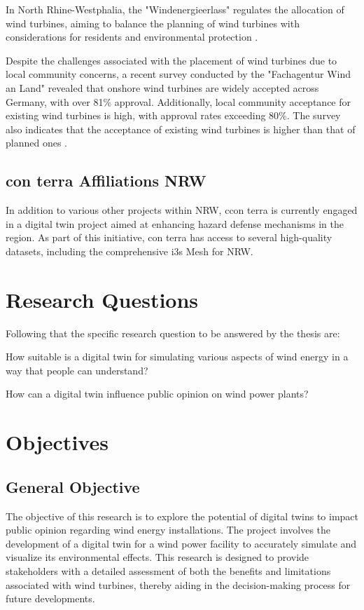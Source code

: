 \documentclass[11pt, titlepage, a4paper]{scrartcl}
\begin{document}
\begin{linenumbers}
    In North Rhine-Westphalia, the "Windenergieerlass" \cite{nrwErlassFurPlanung} regulates the allocation of wind turbines, aiming to balance the planning of wind turbines with considerations for residents and environmental protection \cite{fachagenturwindenergieanlandFachagenturWindenergieLand}.

    Despite the challenges associated with the placement of wind turbines due to local community concerns, a recent survey conducted by the "Fachagentur Wind an Land" revealed that onshore wind turbines are widely accepted across Germany, with over 81\% approval. Additionally, local community acceptance for existing wind turbines is high, with approval rates exceeding 80\%. The survey also indicates that the acceptance of existing wind turbines is higher than that of planned ones \cite{fachagenturwindenergieanlandUmfrageZurAkzeptanz}.

    \subsection{con terra Affiliations NRW}
    In addition to various other projects within NRW, ccon terra is currently engaged in a digital twin project aimed at enhancing hazard defense mechanisms in the region. As part of this initiative, con terra has access to several high-quality datasets, including the comprehensive i3s Mesh for NRW.


    \section{Research Questions}
    Following that the specific research question to be answered by the thesis are:
    \begin{questions}
        \item \label{rq:first_q} How suitable is a digital twin for simulating various aspects of wind energy in a way that people can understand?
        \item \label{rq:second_q} How can a digital twin influence public opinion on wind power plants?
    \end{questions}

    \section{Objectives}
    \subsection{General Objective}
    The objective of this research is to explore the potential of digital twins to impact public opinion regarding wind energy installations. The project involves the development of a digital twin for a wind power facility to accurately simulate and visualize its environmental effects. This research is designed to provide stakeholders with a detailed assessment of both the benefits and limitations associated with wind turbines, thereby aiding in the decision-making process for future developments.


\end{linenumbers}
\end{document}
